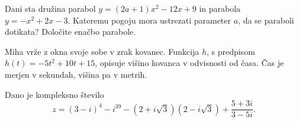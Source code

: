 \documentclass[addpoints]{exam}
\begin{document}
\begin{questions}

    \question[6]
        Dani sta družina parabol $y=(2a+1)x^2-12x+9$ in parabola $y=-x^2+2x-3$.
        Kateremu pogoju mora ustrezati parameter $a$, da se paraboli dotikata?
        Določite enačbo parabole.

            \begin{solution}[8cm]

            \end{solution}


    \question
        Miha vrže z okna svoje sobe v zrak kovanec. Funkcija $h$, s predpisom $h(t)=-5t^2+10t+15$, 
        opisuje višino kovanca v odvisnosti od časa. Čas je merjen v sekundah, višina pa v metrih.
        

            \begin{solution}[3cm]

            \end{solution}


            \newpage
    \question
        Dano je kompleksno število $$z= \left(3-i\right)^4-i^{39}-\left(2+i\sqrt{3}\right)\left(2-i\sqrt{3}\right)+\dfrac{5+3i}{3-5i}. $$

\end{questions}
\end{document}
